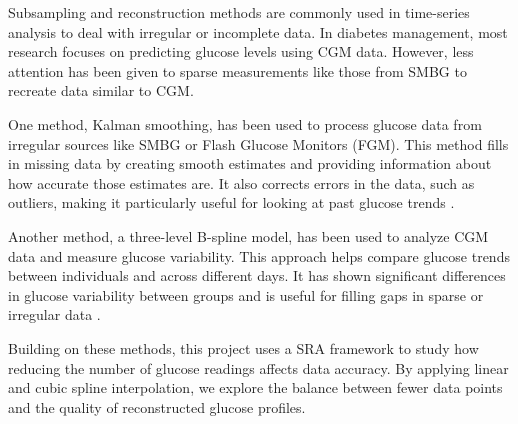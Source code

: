 Subsampling and reconstruction methods are commonly used in time-series analysis to deal with irregular or incomplete data. In diabetes management, most research focuses on predicting glucose levels using CGM data. However, less attention has been given to sparse measurements like those from SMBG to recreate data similar to CGM.

One method, Kalman smoothing, has been used to process glucose data from irregular sources like SMBG or Flash Glucose Monitors (FGM). This method fills in missing data by creating smooth estimates and providing information about how accurate those estimates are. It also corrects errors in the data, such as outliers, making it particularly useful for looking at past glucose trends \cite{Staal2019}.

Another method, a three-level B-spline model, has been used to analyze CGM data and measure glucose variability. This approach helps compare glucose trends between individuals and across different days. It has shown significant differences in glucose variability between groups and is useful for filling gaps in sparse or irregular data \cite{Zheng2011}.

Building on these methods, this project uses a SRA framework to study how reducing the number of glucose readings affects data accuracy. By applying linear and cubic spline interpolation, we explore the balance between fewer data points and the quality of reconstructed glucose profiles.

